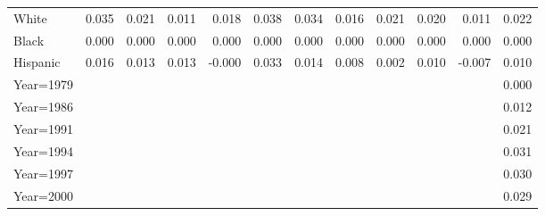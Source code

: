\begin{table}[htbp]
\begin{tabular}{l*{11}{D{.}{.}{-0.5}}}
White               &       0.035\sym{**} &       0.021\sym{**} &       0.011         &       0.018\sym{**} &       0.038\sym{***}&       0.034\sym{***}&       0.016         &       0.021\sym{**} &       0.020\sym{***}&       0.011\sym{*}  &       0.022\sym{***}\\
Black               &       0.000         &       0.000         &       0.000         &       0.000         &       0.000         &       0.000         &       0.000         &       0.000         &       0.000         &       0.000         &       0.000         \\
Hispanic            &       0.016         &       0.013         &       0.013         &      -0.000         &       0.033\sym{***}&       0.014         &       0.008         &       0.002         &       0.010         &      -0.007         &       0.010\sym{***}\\
Year=1979           &                     &                     &                     &                     &                     &                     &                     &                     &                     &                     &       0.000         \\
Year=1986           &                     &                     &                     &                     &                     &                     &                     &                     &                     &                     &       0.012\sym{**} \\
Year=1991           &                     &                     &                     &                     &                     &                     &                     &                     &                     &                     &       0.021\sym{***}\\
Year=1994           &                     &                     &                     &                     &                     &                     &                     &                     &                     &                     &       0.031\sym{***}\\
Year=1997           &                     &                     &                     &                     &                     &                     &                     &                     &                     &                     &       0.030\sym{***}\\
Year=2000           &                     &                     &                     &                     &                     &                     &                     &                     &                     &                     &       0.029\sym{***}\\

\end{tabular}
\end{table}
